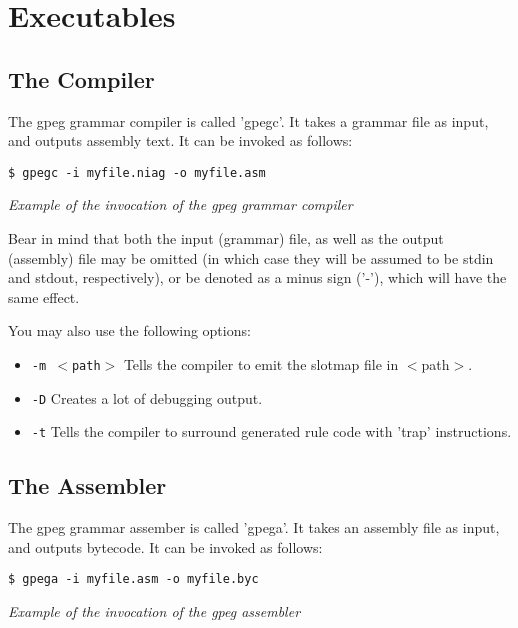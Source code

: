 \section{Executables}
\label{exe:main}

\subsection{The Compiler}
\label{exe:gpegc}

The gpeg grammar compiler is called 'gpegc'.
It takes a grammar file as input, and outputs assembly text.
It can be invoked as follows:

\begin{myquote}
\begin{verbatim}
$ gpegc -i myfile.niag -o myfile.asm
\end{verbatim}
\end{myquote}
\textit{Example of the invocation of the gpeg grammar compiler}

Bear in mind that both the input (grammar) file, as well as the
output (assembly) file may be omitted (in which case they will be
assumed to be stdin and stdout, respectively), or be denoted as
a minus sign ('-'), which will have the same effect.

You may also use the following options:

\begin{itemize}
\item \texttt{-m $<$path$>$} Tells the compiler to emit the slotmap
      file in $<$path$>$.
\item \texttt{-D} Creates a lot of debugging output.
\item \texttt{-t} Tells the compiler to surround generated rule
      code with 'trap' instructions.
\end{itemize}

\subsection{The Assembler}
\label{exe:gpega}

The gpeg grammar assember is called 'gpega'.
It takes an assembly file as input, and outputs bytecode.
It can be invoked as follows:

\begin{myquote}
\begin{verbatim}
$ gpega -i myfile.asm -o myfile.byc
\end{verbatim}
\end{myquote}
\textit{Example of the invocation of the gpeg assembler}


